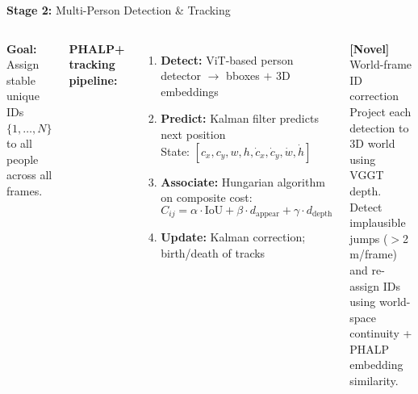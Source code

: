\documentclass[aspectratio=169,11pt]{beamer}
\newcommand{\novel}[1]{\textcolor{novelcolor}{\textbf{[Novel] }}\textcolor{novelcolor}{#1}}
\newcommand{\stage}[2]{\textcolor{accentblue}{\textbf{Stage #1:}} #2}
\begin{document}
\begin{frame}{\stage{2}{Multi-Person Detection \& Tracking}}
  \begin{columns}[T]
      \textbf{Goal:} Assign stable unique IDs $\{1,\ldots,N\}$ to all people
      across all frames.

      \vspace{0.5em}
      \textbf{PHALP+ tracking pipeline:}
      \begin{enumerate}
        \item \textbf{Detect:} ViT-based person detector $\to$ bboxes $+$ 3D embeddings
        \item \textbf{Predict:} Kalman filter predicts next position\\
          {\footnotesize State: $[c_x, c_y, w, h, \dot c_x, \dot c_y, \dot w, \dot h]$}
        \item \textbf{Associate:} Hungarian algorithm on composite cost:
          \[C_{ij} = \alpha \cdot \text{IoU} + \beta \cdot d_{\text{appear}} + \gamma \cdot d_{\text{depth}}\]
        \item \textbf{Update:} Kalman correction; birth/death of tracks
      \end{enumerate}

      \vspace{0.4em}
      \novel{World-frame ID correction}\\
      {\small Project each detection to 3D world using VGGT depth.
      Detect implausible jumps ($>$2\,m/frame) and re-assign IDs
      using world-space continuity + PHALP embedding similarity.}


\end{columns}
\end{frame}
\end{document}
